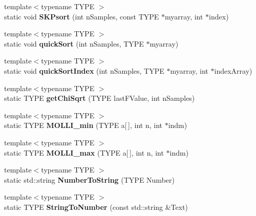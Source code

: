 \begin{DoxyCompactItemize}
{\footnotesize template$<$typename T\+Y\+PE $>$ }\\static void {\bfseries S\+K\+Psort} (int n\+Samples, const T\+Y\+PE $\ast$myarray, int $\ast$index)
\item 
\mbox{\label{class_k_w_util_aacc2b444dd10145dea4367714527efa9}} 
{\footnotesize template$<$typename T\+Y\+PE $>$ }\\static void {\bfseries quick\+Sort} (int n\+Samples, T\+Y\+PE $\ast$myarray)
\item 
\mbox{\label{class_k_w_util_aba1906d9b0de1262e0ce837b15e8401f}} 
{\footnotesize template$<$typename T\+Y\+PE $>$ }\\static void {\bfseries quick\+Sort\+Index} (int n\+Samples, T\+Y\+PE $\ast$myarray, int $\ast$index\+Array)
\item 
\mbox{\label{class_k_w_util_a2e55b0bcf1bbf1155654b748a7064cbf}} 
{\footnotesize template$<$typename T\+Y\+PE $>$ }\\static T\+Y\+PE {\bfseries get\+Chi\+Sqrt} (T\+Y\+PE last\+F\+Value, int n\+Samples)
\item 
\mbox{\label{class_k_w_util_a6401111c5ce49eb97e1c79bae84b3868}} 
{\footnotesize template$<$typename T\+Y\+PE $>$ }\\static T\+Y\+PE {\bfseries M\+O\+L\+L\+I\+\_\+min} (T\+Y\+PE a\mbox{[}$\,$\mbox{]}, int n, int $\ast$indm)
\item 
\mbox{\label{class_k_w_util_af0fee5e9d89e7c029c346804480d5832}} 
{\footnotesize template$<$typename T\+Y\+PE $>$ }\\static T\+Y\+PE {\bfseries M\+O\+L\+L\+I\+\_\+max} (T\+Y\+PE a\mbox{[}$\,$\mbox{]}, int n, int $\ast$indm)
\item 
\mbox{\label{class_k_w_util_a10aaa83c83c801ef07c95a29e1acdc4e}} 
{\footnotesize template$<$typename T\+Y\+PE $>$ }\\static std\+::string {\bfseries Number\+To\+String} (T\+Y\+PE Number)
\item 
\mbox{\label{class_k_w_util_adea4c36750f518d1f2c90af14742a0f6}} 
{\footnotesize template$<$typename T\+Y\+PE $>$ }\\static T\+Y\+PE {\bfseries String\+To\+Number} (const std\+::string \&Text)

\end{DoxyCompactItemize}
